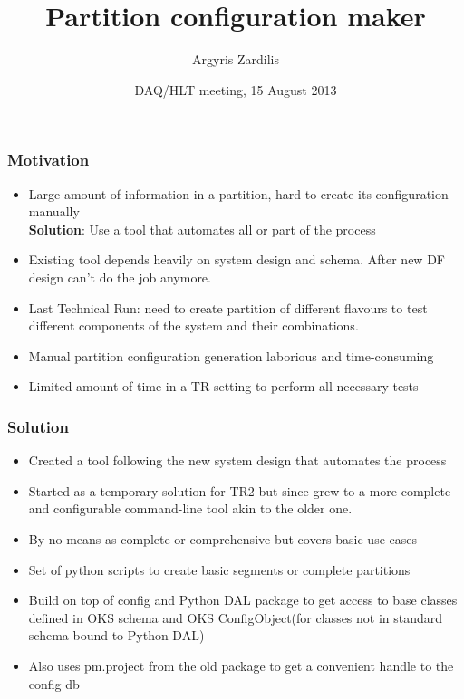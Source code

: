 \documentclass{beamer}
\title%
{Partition configuration maker}
\author[Argyris Zardilis] %
{Argyris Zardilis \inst{}}
\institute[CERN] %
{
  \inst{}%
  CERN
}
\date[DAQ/HLT meeting, 15/08/2013] %
{DAQ/HLT meeting, 15 August 2013}
\begin{document}
\frame{\titlepage}

\begin{frame}
  \frametitle{Motivation}
  \begin{itemize}
    \item Large amount of information in a partition, hard to create its configuration manually \\
      \textbf{Solution}: Use a tool that automates all or part of the process

    \item Existing tool depends heavily on system design and schema. After new DF design can't do the
      job anymore.

    \item Last Technical Run: need to create partition of different flavours to test different components
      of the system and their combinations.

    \item Manual partition configuration generation laborious and time-consuming

    \item Limited amount of time in a TR setting to perform all necessary tests
  \end{itemize}
  
\end{frame}


\begin{frame}
  \frametitle{Solution}
  \begin{itemize}
    \item Created a tool following the new system design that automates the process

    \item Started as a temporary solution for TR2 but since grew to a more complete
      and configurable command-line tool akin to the older one.

    \item By no means as complete or comprehensive but covers basic use cases

    \item Set of python scripts to create basic segments or complete partitions

    \item Build on top of config and Python DAL package to get access to base classes defined in OKS schema and
      OKS ConfigObject(for classes not in standard schema bound to Python DAL)

    \item Also uses pm.project from the old package to get a convenient handle to the config db

  \end{itemize}

\end{frame}
\end{document}
